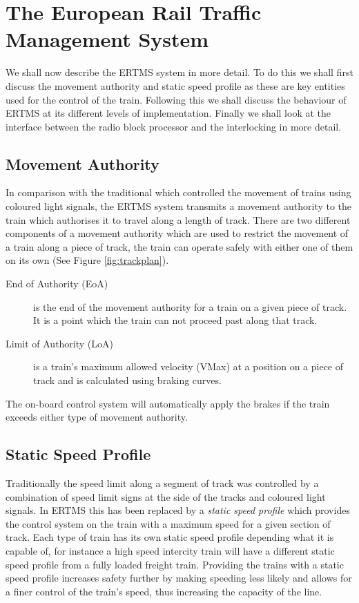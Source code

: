 \section{The European Rail Traffic Management System}
We shall now describe the ERTMS system in more detail. To do this we shall first discuss the movement authority and static speed profile as these are key entities used for the control of the train. Following this we shall discuss the behaviour of ERTMS at its different levels of implementation. Finally we shall look at the interface between the radio block processor and the interlocking in more detail.

\subsection*{Movement Authority}
In comparison with the traditional which controlled the movement of trains using coloured light signals, the ERTMS system transmits a movement authority to the train which authorises it to travel along a length of track. There are two different components of a movement authority which are used to restrict the movement of a train along a piece of track, the train can operate safely with either one of them on its own (See Figure \ref{fig:trackplan}).
\begin{description}

\item[End of Authority (EoA)] is the end of the movement authority for a train on a given piece of track. It is a point which the train can not proceed past along that track.

\item[Limit of Authority (LoA)]
 is a train's maximum allowed velocity (VMax) at a position on a piece of track and is calculated using braking curves.

\end{description}

The on-board control system will automatically apply the brakes if the train exceeds either type of movement authority.


\subsection*{Static Speed Profile}
Traditionally the speed limit along a segment of track was controlled by a combination of speed limit signs at the side of the tracks and coloured light signals. In ERTMS this has been replaced by a \emph{static speed profile} which provides the control system on the train with a maximum speed for a given section of track. Each type of train has its own static speed profile depending what it is capable of, for instance a high speed intercity train will have a different static speed profile from a fully loaded freight train. Providing the trains with a static speed profile increases safety further by making speeding less likely and allows for a finer control of the train's speed, thus increasing the capacity of the line.



